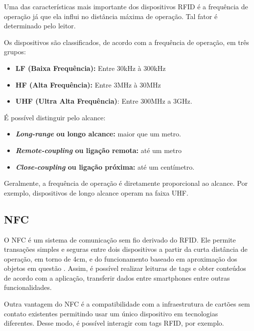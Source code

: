 \documentclass[
	article,			%
	11pt,				%
	oneside,			%
	a4paper,			%
	section=TITLE,		%
	subsection=TITLE,	%
	english,			%
	brazil,				%
	sumario=tradicional
	]{abntex2}
\begin{document}


Uma das características mais importante dos dispositivos RFID é a frequência de operação já que ela 
influi no distância máxima de operação. Tal fator é determinado pelo leitor. 

Os dispositivos são classificados, de acordo com a frequência de operação, em três grupos:

\begin{itemize} \parskip -4pt
	\item \textbf{LF (Baixa Frequência):} Entre 30kHz à 300kHz
	\item \textbf{HF (Alta Frequência):} Entre 3MHz à 30MHz
	\item \textbf{UHF (Ultra Alta Frequência)}: Entre 300MHz a 3GHz.
\end{itemize}

É possível distinguir pelo alcance:

\begin{itemize} \parskip -4pt
	\item \textbf{\textit{Long-range} ou longo alcance:} maior que um metro.
	\item \textbf{\textit{Remote-coupling} ou ligação remota:} até um metro
	\item \textbf{\textit{Close-coupling} ou ligação próxima:} até um centímetro.
\end{itemize}

Geralmente, a frequência de operação é diretamente proporcional ao alcance. Por exemplo, 
dispositivos de longo alcance operam na faixa UHF. 






\subsection{NFC}
O NFC é um sistema de comunicação sem fio derivado do RFID. Ele permite transações simples e 
seguras entre dois dispositivos a partir da curta distância de operação, em torno de 
4cm, e do funcionamento baseado em aproximação dos objetos em questão \cite{nfcforumabout2017}. 
Assim, é 
possível realizar leituras de tags e obter conteúdos de acordo com a aplicação, transferir dados 
entre smartphones entre outras funcionalidades.

Outra vantagem do NFC é a compatibilidade com a infraestrutura de cartões sem contato 
existentes permitindo usar um único dispositivo em tecnologias diferentes. Desse modo, é possível 
interagir com tags RFID, por exemplo.
\end{document}
